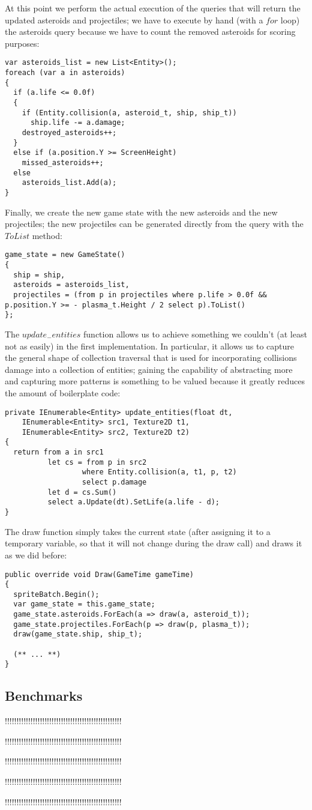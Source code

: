 At this point we perform the actual execution of the queries that will return the updated asteroids and projectiles; we have to execute by hand (with a $for$ loop) the asteroids query because we have to count the removed asteroids for scoring purposes:
\begin{lstlisting}
var asteroids_list = new List<Entity>();
foreach (var a in asteroids)
{
  if (a.life <= 0.0f)
  {
    if (Entity.collision(a, asteroid_t, ship, ship_t))
      ship.life -= a.damage;
    destroyed_asteroids++;
  }
  else if (a.position.Y >= ScreenHeight)
    missed_asteroids++;
  else
    asteroids_list.Add(a);
}
\end{lstlisting}

Finally, we create the new game state with the new asteroids and the new projectiles; the new projectiles can be generated directly from the query with the $ToList$ method:
\begin{lstlisting}
game_state = new GameState()
{
  ship = ship,
  asteroids = asteroids_list,
  projectiles = (from p in projectiles where p.life > 0.0f && p.position.Y >= - plasma_t.Height / 2 select p).ToList()
};
\end{lstlisting}

The $update_{-}entities$ function allows us to achieve something we couldn't (at least not as easily) in the first implementation. In particular, it allows us to capture the general shape of collection traversal that is used for incorporating collisions damage into a collection of entities; gaining the capability of abstracting more and capturing more patterns is something to be valued because it greatly reduces the amount of boilerplate code:
\begin{lstlisting}
private IEnumerable<Entity> update_entities(float dt, 
    IEnumerable<Entity> src1, Texture2D t1,
    IEnumerable<Entity> src2, Texture2D t2)
{
  return from a in src1
          let cs = from p in src2
                  where Entity.collision(a, t1, p, t2)
                  select p.damage
          let d = cs.Sum()
          select a.Update(dt).SetLife(a.life - d);
}
\end{lstlisting}

The draw function simply takes the current state (after assigning it to a temporary variable, so that it will not change during the draw call) and draws it as we did before:
\begin{lstlisting}
public override void Draw(GameTime gameTime)
{
  spriteBatch.Begin();
  var game_state = this.game_state;
  game_state.asteroids.ForEach(a => draw(a, asteroid_t));
  game_state.projectiles.ForEach(p => draw(p, plasma_t));
  draw(game_state.ship, ship_t);

  (** ... **)
}
\end{lstlisting}

\subsection{Benchmarks}

!!!!!!!!!!!!!!!!!!!!!!!!!!!!!!!!!!!!!!!!!!!!!!!!!!

!!!!!!!!!!!!!!!!!!!!!!!!!!!!!!!!!!!!!!!!!!!!!!!!!!

!!!!!!!!!!!!!!!!!!!!!!!!!!!!!!!!!!!!!!!!!!!!!!!!!!

!!!!!!!!!!!!!!!!!!!!!!!!!!!!!!!!!!!!!!!!!!!!!!!!!!

!!!!!!!!!!!!!!!!!!!!!!!!!!!!!!!!!!!!!!!!!!!!!!!!!!
